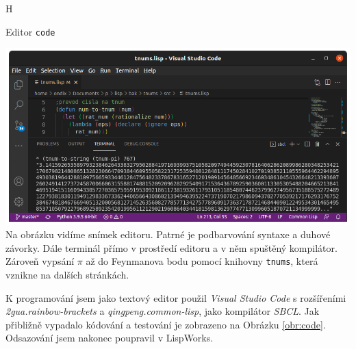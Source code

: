 \begin{myfigure}{H}
\caption{Editor \texttt{code}}
\includegraphics[width=\linewidth]{./graphics/code.png}\label{obr:code}
Na obrázku vidíme snímek editoru. Patrné je podbarvování syntaxe a duhové závorky. Dále terminál přímo v prostředí editoru a v něm spuštěný kompilátor. Zároveň vypsání $\pi$ až do Feynmanova bodu pomocí knihovny \texttt{tnums}, která vznikne na dalších stránkách.
\end{myfigure}

K programování jsem jako textový editor použil \textit{Visual Studio Code} s rozšířeními \textit{2gua.rainbow-brackets} a \textit{qingpeng.common-lisp}, jako kompilátor \textit{SBCL}. Jak přibližně vypadalo kódování a testování je zobrazeno na Obrázku \ref{obr:code}. Odsazování jsem nakonec poupravil v LispWorks.
\FloatBarrier